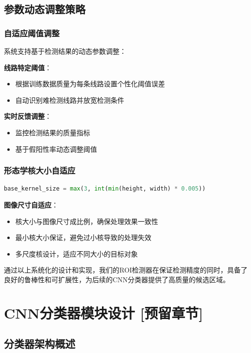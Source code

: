 \documentclass[12pt,a4paper]{article}
\begin{document}
\subsection{参数动态调整策略}

\subsubsection{自适应阈值调整}

系统支持基于检测结果的动态参数调整：

\textbf{线路特定阈值}：
\begin{itemize}
    \item 根据训练数据质量为每条线路设置个性化阈值误差
    \item 自动识别难检测线路并放宽检测条件
\end{itemize}

\textbf{实时反馈调整}：
\begin{itemize}
    \item 监控检测结果的质量指标
    \item 基于假阳性率动态调整阈值
\end{itemize}

\subsubsection{形态学核大小自适应}

\begin{lstlisting}[language=Python]
base_kernel_size = max(3, int(min(height, width) * 0.005))
\end{lstlisting}

\textbf{图像尺寸自适应}：
\begin{itemize}
    \item 核大小与图像尺寸成比例，确保处理效果一致性
    \item 最小核大小保证，避免过小核导致的处理失效
    \item 多尺度核设计，适应不同大小的目标对象
\end{itemize}

通过以上系统化的设计和实现，我们的ROI检测器在保证检测精度的同时，具备了良好的鲁棒性和可扩展性，为后续的CNN分类器提供了高质量的候选区域。

\section{CNN分类器模块设计 \textbf{[预留章节]}}

\subsection{分类器架构概述}
\end{document}
